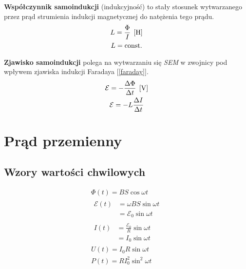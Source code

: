 \newpage %
\begin{definition}
  \textbf{Współczynnik samoindukcji} (indukcyjność) to stały stosunek wytwarzanego przez prąd
  strumienia indukcji magnetycznej do natężenia tego prądu.
  \begin{gather*}
    L = \frac\Phi I \;\left[\mathrm{H}\right]\\
    L = \operatorname{const.}
  \end{gather*}
\end{definition}

\begin{definition}
  \textbf{Zjawisko samoindukcji} polega na wytwarzaniu się \textit{SEM} w zwojnicy pod wpływem
  zjawiska indukcji Faradaya [\ref{faraday}].
  \begin{equation}
    \begin{gathered}
      \mathcal E = -\frac{\Delta\Phi}{\Delta t}\;\left[\mathrm{V}\right]\\
      \mathcal E = -L\frac{\Delta I}{\Delta t}
    \end{gathered}
  \end{equation}
\end{definition}

\section{Prąd przemienny}
\subsection{Wzory wartości chwilowych}
\begin{subequations}
  \begin{gather}
    \Phi(t) = BS\cos\omega t\\[10pt]
    \begin{aligned}
      \mathcal E(t) &= \omega BS\sin\omega t\\
      &= \mathcal E_0\sin\omega t
    \end{aligned}\\[10pt]
    \begin{aligned}
      I(t) &= \frac{\mathcal E_0}{R}\sin\omega t\\
      &= I_0\sin\omega t
    \end{aligned}\\[10pt]
    U(t) = I_0R\sin\omega t\\[10pt]
    P(t) = RI_0^2\sin^2\omega t
  \end{gather}
\end{subequations}

